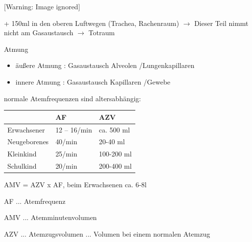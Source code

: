 \documentclass{article}
\begin{document}
\begin{center}
 [Warning: Image ignored] %

\end{center}
+ 150ml in den oberen Luftwegen (Trachea, Rachenraum) ${\rightarrow}$
Dieser Teil nimmt nicht am Gasaustausch ${\rightarrow}$
Totraum 

Atmung

\begin{itemize}
\item \"au{\ss}ere  Atmung : Gasaustausch Alveolen /Lungenkapillaren

\item innere  Atmung : Gasaustausch Kapillaren /Gewebe

\end{itemize}
normale Atemfrequenzen sind altersabh\"angig:

\begin{center}
\begin{tabular}{|m{4.367cm}|m{4.367cm}|m{4.367cm}|}
\hline
 &
\centering AF\par

 &
\centering AZV\par

\\\hline
Erwachsener

 &
12 -- 16/min

 &
ca.  500 ml

\\\hline
Neugeborenes

 &
40/min 

 &
20-40 ml

\\\hline
Kleinkind

 &
25/min

 &
100-200 ml

\\\hline
Schulkind

 &
20/min

 &
200-400 ml

\\\hline
\end{tabular}
\end{center}
AMV = AZV x AF, beim Erwachsenen  ca. 6-8l

AF  ... Atemfrequenz

AMV  ... Atemminutenvolumen

AZV  ... Atemzugsvolumen ... Volumen bei einem normalen Atemzug
\end{document}
